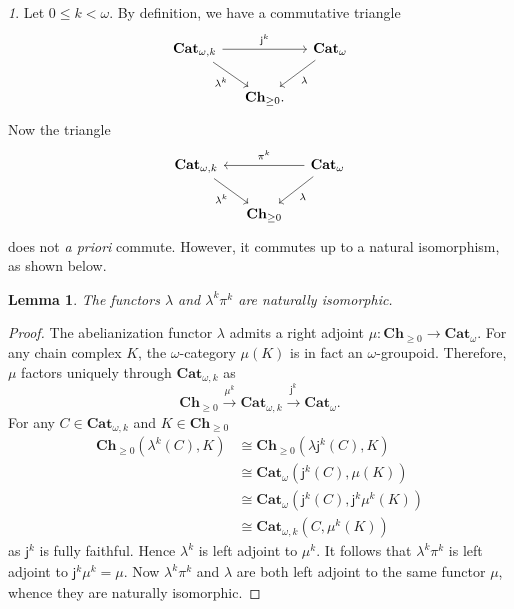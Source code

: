 \documentclass[reqno]{amsart}
\theoremstyle{plain}
\newtheorem{lemma}[subsubsection]{Lemma}
\theoremstyle{definition}
\theoremstyle{remark}
\newtheorem{paragr}[subsubsection]{} %
\newcommand{\homset}[3]{#1(#2,#3)} %
\newcommand{\ctg}[1]{\mathbf{#1}}  %
\newcommand{\Cat}{\ctg{Cat}}   %
\newcommand{\nCat}[1]{\Cat_{#1}}  %
\newcommand{\opCat}[1]{\Cat_{\omega,#1}} %
\newcommand{\oCat}{\nCat{\omega}} %
\newcommand{\Ch}[1]{\ctg{Ch}_{#1}} %
\newcommand{\Chp}{\Ch{\geq 0}} %
\newcommand{\functor}[1]{\mathsf{#1}} %
\newcommand{\emb}[2]{\functor{j}_{#2}^{#1}}%
\newcommand{\pifun}[2]{\functor{\pi}_{#2}^{#1}}%
\newcommand{\oemb}[1]{\emb{#1}{}}%
\newcommand{\opifun}[1]{\pifun{#1}{}}%
\newcommand{\abel}{\functor{\lambda}} %
\newcommand{\abelk}[1]{\functor{\abel}^{#1}}%
\newcommand{\oo}{\ensuremath{\omega}}
\newcommand{\nbd}{\nobreakdash} %
\begin{document}
\begin{paragr}\label{paragr:abelloc}
  Let $0 \leq k < \oo$. By definition,
  we have a commutative triangle
  \[
    \begin{tikzcd}[column sep=small]
      \opCat{k}\ar[rr,"\oemb{k}"]\ar[rd,"\abelk{k}"']&& \oCat\ar[dl,"\abel"] \\
      &\Chp.&
  \end{tikzcd}
\]
Now the triangle
 \[
    \begin{tikzcd}[column sep=small]
      \opCat{k}\ar[rd,"\abelk{k}"']&& \oCat\ar[dl,"\abel"] \ar[ll,"\opifun{k}"']\\
      &\Chp&
  \end{tikzcd}
\]
does not {\em a priori} commute. However, it commutes up to a natural
isomorphism, as shown below.
\end{paragr}
\begin{lemma}\label{lemma:abelpi}
  The functors $\abel$ and $\abelk{k}\opifun{k}$ are naturally isomorphic.
\end{lemma}
\begin{proof}
The abelianization functor $\abel$ admits a right adjoint $\mu \colon
\Chp \to \oCat$. For any chain complex $K$, the
\oo-category $\mu(K)$ is in fact an \oo\nbd-groupoid. Therefore, $\mu$ factors uniquely through  $\opCat{k}$ as
  \[
    \Chp \overset{\mu^k}{\longrightarrow} \opCat{k}
    \overset{\oemb{k}}{\longrightarrow} \oCat.
  \] 
  For any $C\in\opCat{k}$ and $K\in\Chp$
  \begin{align*}
    \homset{\Chp}{\abelk{k}(C)}{K} &\cong
                                     \homset{\Chp}{\abel\oemb{k}(C)}{K}\\
                                                     &\cong
                                                       \homset{\oCat}{\oemb{k}(C)}{\mu(K)}\\
                                                     & \cong
                                                       \homset{\oCat}{\oemb{k}(C)}{\oemb{k}\mu^k(K)}\\
                                   &\cong \homset{\opCat{k}}{C}{\mu^k(K)}
                                   \end{align*}
  as $\oemb{k}$ is fully faithful. Hence $\abelk{k}$ is left adjoint
  to $\mu^k$. It follows that $\abelk{k}\opifun{k}$ is left adjoint to
  $\oemb{k}\mu^k=\mu$. Now $\abelk{k}\opifun{k}$ and
  $\abel$ are both left adjoint to the same functor $\mu$, whence
  they are naturally isomorphic.
\end{proof}
\end{document}

